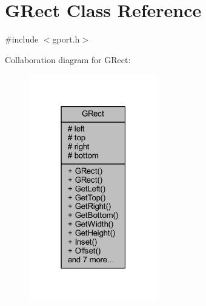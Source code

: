 \hypertarget{class_g_rect}{}\section{G\+Rect Class Reference}
\label{class_g_rect}


{\ttfamily \#include $<$gport.\+h$>$}



Collaboration diagram for G\+Rect\+:\nopagebreak
\begin{figure}[H]
\begin{center}
\leavevmode
\includegraphics[width=159pt]{class_g_rect__coll__graph}
\end{center}
\end{figure}
